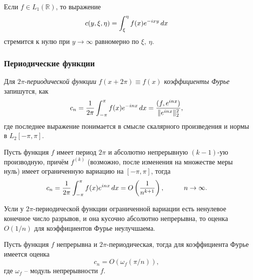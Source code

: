 \begin{to_thr}
    Если $f \in L_1(\mathbb{R})$, то выражение
    \begin{equation*}
        c(y, \xi, \eta) = \int_\xi^\eta f(x) e^{-ixy} \, d x
    \end{equation*}
    стремится к нулю при $y \to \infty$ равномерно по $\xi, \ \eta$.
\end{to_thr}


\subsubsection*{Периодические функции}


\begin{to_def}
    Для $2\pi$-\textit{периодической функции}  $f(x+2\pi) \equiv f(x)$ \textit{коэффициенты Фурье}  запишутся, как
    \begin{equation*}
        c_n = \frac{1}{2\pi} \int_{-\pi}^{\pi} 
        f(x) e^{-inx} \, d x = 
        \frac{
        (f, e^{inx})
        }{
        \|e^{inx}\|_2^2
        },
    \end{equation*}
    где последнее выражение понимается в смысле скалярного произведения и нормы в $L_2 [-\pi, \pi]$.
\end{to_def}

\begin{to_thr}[]
    Пусть функция $f$ имеет период $2 \pi$ и абсолютно непрерывную $(k-1)$-ую производную, причём $f^(k)$ (возможно, после изменения на множестве меры нуль) имеет ограниченную вариацию на $[-\pi, \pi]$, тогда
    \begin{equation*}
        c_n = \frac{1}{2\pi} \int_{-\pi}^{\pi} f(x) e^{inx} \, d x =
        O\left(\frac{1}{n^{k+1}}\right),
        \hspace{1 cm}
        n \to \infty.
    \end{equation*}
\end{to_thr}


\begin{to_lem}
    Усли у $2\pi$-периодической функции ограниченной вариации есть ненулевое конечное число разрывов, и она кусочно абсолютно непрерывна, то оценка $O(1/n)$ для коэффициентов Фурье неулучшаема.
\end{to_lem}

\begin{to_thr}[]
    Пусть функция $f$ непрерывна и $2\pi$-периодическая, тогда для коэффициента Фурье имеется оценка
    \begin{equation*}
        c_n = O(\omega_f (\pi/n)),
    \end{equation*}
    где $\omega_f$ -- модуль непрерывности $f$.
\end{to_thr}